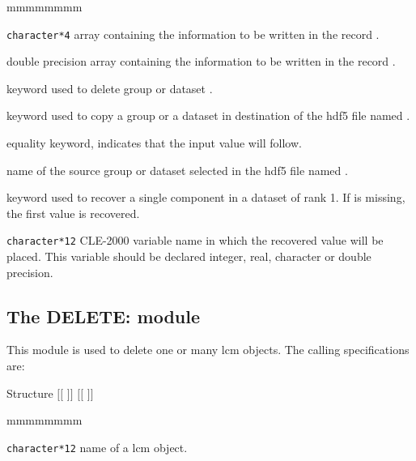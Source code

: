 \begin{ListeDeDescription}{mmmmmmmm}
\item[\dusa{hvalc}] {\tt character*4} array containing the information to be written in the record .

\item[\dusa{dvalc}] double precision array containing the information to be written in the record .

\item[\moc{DELE}] keyword used to delete group or dataset .

\item[\moc{COPY}] keyword used to copy a group or a dataset in destination  of the {\sc hdf5} file named .

\item[\moc{=}] equality keyword, indicates that the input value will follow.

\item[\dusa{BLOCK2}] name of the source group or dataset selected in the {\sc hdf5} file named .

\item[\moc{GREP}] keyword used to recover a single component in a dataset of rank 1. If  is missing, the first value is recovered.

\item[\dusa{value}] {\tt character*12} CLE-2000 variable name in which the recovered value will be placed. This variable should be
declared integer, real, character or double precision.

\end{ListeDeDescription}

\clearpage

\subsection{The DELETE: module}\label{sect:DELETEData}

This module is used to delete one or many {\sc lcm} objects. The calling
specifications are:

\begin{DataStructure}{Structure }
$[[$  $]]$ \moc{:=}  $[[$  $]]$ \moc{;}
\end{DataStructure}

\begin{ListeDeDescription}{mmmmmmmm}

\item[\dusa{NAME1}] {\tt character*12} name of a {\sc lcm} object.

\end{ListeDeDescription}

